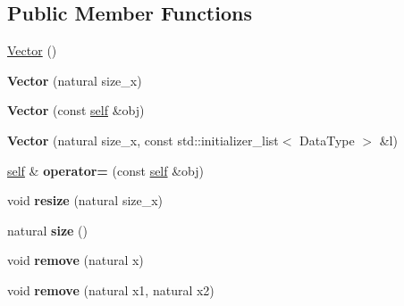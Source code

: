 \subsection*{Public Member Functions}
\begin{DoxyCompactItemize}
\item 
\hyperlink{classez_1_1maths_1_1Vector_a91c04bdb0e9cdba97affc0c2918e2c34}{Vector} ()
\item 
\mbox{\label{classez_1_1maths_1_1Vector_a12664c78d5ed14af0b7f4e9170830071}} 
{\bfseries Vector} (natural size\+\_\+x)
\item 
\mbox{\label{classez_1_1maths_1_1Vector_adf99adc771f4ccb20274d6fbc7729850}} 
{\bfseries Vector} (const \hyperlink{classez_1_1maths_1_1Vector}{self} \&obj)
\item 
\mbox{\label{classez_1_1maths_1_1Vector_ab374e5d1284555c75f4842563b60650a}} 
{\bfseries Vector} (natural size\+\_\+x, const std\+::initializer\+\_\+list$<$ Data\+Type $>$ \&l)
\item 
\mbox{\label{classez_1_1maths_1_1Vector_afe1d34cecaaaf270d13e8799deb17a3f}} 
\hyperlink{classez_1_1maths_1_1Vector}{self} \& {\bfseries operator=} (const \hyperlink{classez_1_1maths_1_1Vector}{self} \&obj)
\item 
\mbox{\label{classez_1_1maths_1_1Vector_a066caa4ad34cad4f837ae6829d9856d0}} 
void {\bfseries resize} (natural size\+\_\+x)
\item 
\mbox{\label{classez_1_1maths_1_1Vector_af6d9a0091cfc04321b62222d319921cf}} 
natural {\bfseries size} ()
\item 
\mbox{\label{classez_1_1maths_1_1Vector_aea7e74920e38c1dd0e29f0637025a8f2}} 
void {\bfseries remove} (natural x)
\item 
\mbox{\label{classez_1_1maths_1_1Vector_a74d160fb45e8122a4414b3f734f03f72}} 
void {\bfseries remove} (natural x1, natural x2)
\item 
\mbox{\label{classez_1_1maths_1_1Vector_a08f354b6b79d3f75ad155a9eb01cead5}} 

\end{DoxyCompactItemize}
